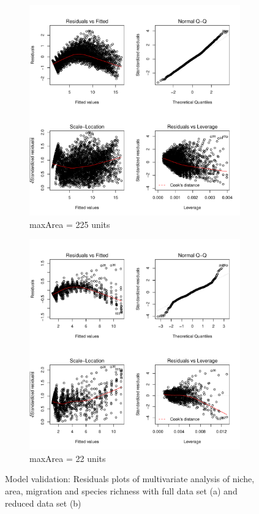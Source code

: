 \documentclass{article}
\begin{document}
\begin{figure}[h!]
  \centering
  \begin{subfigure}[b]{0.4\linewidth}
    \includegraphics[width=\linewidth]{../../Results/Simulation/NicheAreaMigrationLmPlot_1.pdf}
    \caption{maxArea = 225 units}
  \end{subfigure}
  \begin{subfigure}[b]{0.4\linewidth}
    \includegraphics[width=\linewidth]{../../Results/Simulation/NicheAreaMigrationLmPlot_10.pdf}
    \caption{maxArea = 22 units}
  \end{subfigure}
  \caption{Model validation: Residuals plots of multivariate analysis of niche, area, migration and species richness with full data set (a) and reduced data set (b)}
  \label{fig:Model validation multivariate 1}
\end{figure}
\end{document}
